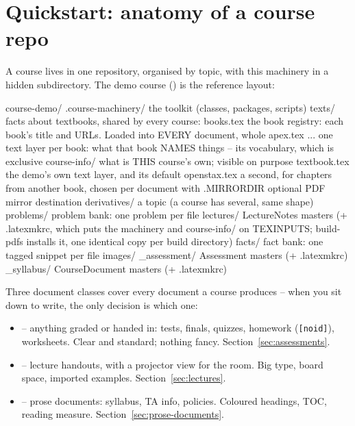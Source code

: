 \section{Quickstart: anatomy of a course repo}\label{sec:quickstart}

A course lives in one repository, organised by topic, with this machinery in
a hidden subdirectory. The demo course () is the
reference layout:

\begin{manexsource}
course-demo/
  .course-machinery/        the toolkit (classes, packages, scripts)
    texts/                  facts about textbooks, shared by every course:
      books.tex             the book registry: each book's title and URLs.
                            Loaded into EVERY document, whole
      apex.tex ...          one text layer per book: what that book NAMES
                            things -- its vocabulary, which is exclusive
  course-info/              what is THIS course's own; visible on purpose
    textbook.tex            the demo's own text layer, and its default
    openstax.tex            a second, for chapters from another book,
                            chosen per document with \usetext
  .MIRRORDIR                optional PDF mirror destination
  derivatives/              a topic (a course has several, same shape)
    problems/               problem bank: one problem per file
    lectures/               LectureNotes masters (+ .latexmkrc, which puts the
                            machinery and course-info/ on TEXINPUTS; build-pdfs
                            installs it, one identical copy per build directory)
    facts/                  fact bank: one tagged snippet per file
    images/
  _assessment/              Assessment masters (+ .latexmkrc)
  _syllabus/                CourseDocument masters (+ .latexmkrc)
\end{manexsource}

Three document classes cover every document a course produces -- when you
sit down to write, the only decision is which one:

\begin{itemize}
  \item {} -- anything graded or handed in: tests, finals,
    quizzes, homework (\texttt{[noid]}), worksheets. Clear and standard;
    nothing fancy. Section~\ref{sec:assessments}.
  \item {} -- lecture handouts, with a projector view for
    the room. Big type, board space, imported examples.
    Section~\ref{sec:lectures}.
  \item {} -- prose documents: syllabus, TA info,
    policies. Coloured headings, TOC, reading measure.
    Section~\ref{sec:prose-documents}.
\end{itemize}


